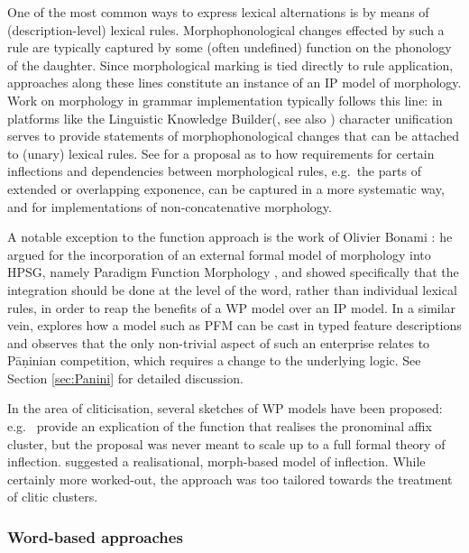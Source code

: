 \documentclass[output=paper
 	        ,biblatex
                ,babelshorthands
                ,newtxmath
                ,draftmode
                ,colorlinks, citecolor=brown
]{langscibook}
\begin{document}
One of the most common ways to express lexical alternations is by
means of (description-level) lexical rules. Morphophonological changes
effected by such a rule are typically captured by some (often
undefined) function on the phonology of the daughter. Since
morphological marking is tied directly to rule application, approaches
along these lines constitute an instance of an IP model of
morphology. Work on morphology in grammar implementation typically
follows this line: in platforms like the Linguistic Knowledge
Builder\indexlkb  (\citealp[LKB;][]{Copestake02}, see also \crossrefchapteralp[\page \pageref{cl:delphin}]{cl})
character unification serves to provide statements of
morphophonological changes that can be attached to (unary) lexical
rules. See \citet{Goodman10} for a proposal as to how requirements for
certain inflections and dependencies
between morphological rules, e.g.\ the parts of extended or overlapping
exponence, can be captured in a more systematic way,
and \citet{Crysmann:15:JLM,Crysmann:2017:JOMO} for implementations of
non-concatenative morphology. 


A notable exception to the function approach is the work of Olivier
Bonami \citep{bonami2015diversity,Bonami14d}: he argued for the incorporation of an
external formal model of morphology into HPSG, namely Paradigm Function
Morphology  \citep[=PFM;][]{Stump01}, and
showed specifically that the integration should be done at the level
of the word, rather than individual lexical rules, in order to reap
the benefits of a WP model over an IP model. In a similar vein,
\citet{Erjavec94} explores how a model such as PFM can be cast in
typed feature descriptions and observes that the only non-trivial
aspect of such an enterprise relates to Pāṇinian competition, which
requires a change to the underlying logic. See Section
\ref{sec:Panini} for detailed discussion.

In the area of cliticisation, several sketches of WP models have been
proposed: e.g.\ \citet{Miller97} provide an explication of the function
that realises the pronominal affix cluster, but the proposal was never
meant to scale up to a full formal theory of
inflection. \citet{crysmann_b03book} suggested a realisational,
morph-based model of inflection. While certainly more worked-out, the
approach was too tailored towards the treatment of clitic
clusters. 



\subsubsection{Word-based approaches}
\end{document}
